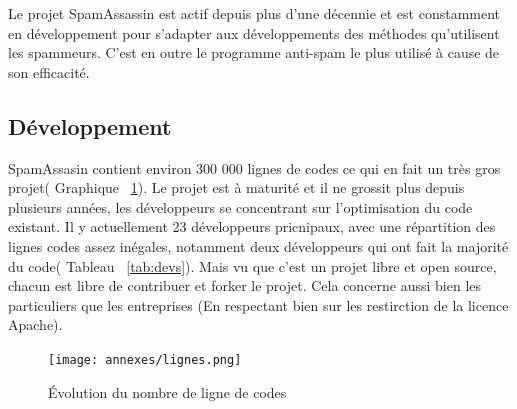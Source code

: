 \documentclass[a4paper,11pt]{article}
\begin{document}
Le projet SpamAssassin est actif depuis plus d'une décennie et est constamment en développement 
pour s'adapter aux développements des méthodes qu'utilisent les spammeurs. C'est en outre le programme anti-spam le plus utilisé à cause de son efficacité.

\subsection{Développement}

SpamAssasin contient environ 300 000 lignes de codes ce qui en fait un très gros projet( Graphique ~\ref{fig:code}).
Le projet est à maturité et il ne grossit plus depuis plusieurs années, les développeurs se concentrant sur l'optimisation du code existant.
Il y actuellement 23 développeurs pricnipaux, avec une répartition des lignes codes assez inégales, notamment deux développeurs qui ont fait la majorité du code( Tableau ~\ref{tab:devs}).
Mais vu que c'est un projet libre et open source, chacun est libre de contribuer et forker le projet. Cela concerne aussi 
bien les particuliers que les entreprises (En respectant bien sur les restirction de la licence Apache).

\begin{figure}
 \texttt{[image: annexes/lignes.png]}
  \caption{Évolution du nombre de ligne de codes}
  \label {fig:code}
\end{figure}
\end{document}
